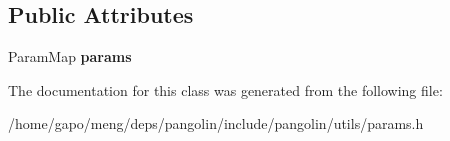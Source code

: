 \subsection*{Public Attributes}
\begin{DoxyCompactItemize}
\item 
Param\+Map {\bfseries params}\hypertarget{classpangolin_1_1_params_a03130e8d576709a8dd06a7776e09a26e}{}\label{classpangolin_1_1_params_a03130e8d576709a8dd06a7776e09a26e}

\end{DoxyCompactItemize}


The documentation for this class was generated from the following file\+:\begin{DoxyCompactItemize}
\item 
/home/gapo/meng/deps/pangolin/include/pangolin/utils/params.\+h\end{DoxyCompactItemize}
